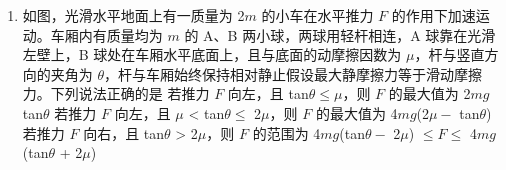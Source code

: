 \documentclass[\gkver]{gaokaozhenti}
\begin{document}
\begin{enumerate}
{B．线圈产生感应电动势的最大值 $E_{\text{max}} = nBS \cdot 4\omega$，又 $S = L^{2}$，联立可得 $E_{\text{max}} = 4nBL^{2}\omega$，则线圈产生感应电动势的有效值 $E=\frac{E_{\max}}{\sqrt{2}}=2\sqrt{2}nBL^{2}\omega$，根据串联电路分压原理可知灯泡两端电压有效值为 $U=\frac{RE}{R+R}=\sqrt{2}nBL^{2}\omega$，B 错误；

C．若用总长为原来两倍的相同漆包线重新绕制成边长仍为 $L$ 的多匝正方形线圈，则线圈的匝数变为原来的 2 倍，线圈产生感应电动势的最大值 $E_{\max}^{'} = 8nBL^{2}\omega$，此时线圈产生感应电动势的有效值 $E' = \frac{E_{\max}'}{\sqrt{2}} = 4\sqrt{2}nBL^{2}\omega$，根据电阻定律 $R' = \rho \frac{l}{S'}$，可知线圈电阻变为原来的 2 倍，即为 $2R$，根据串联电路分压原理可得灯泡两端电压有效值 $U' = \frac{RE'}{R + 2R} = \frac{4 \cdot 2}{3} nBL^{2}\omega$，C 正确；

D．若仅将小轮半径变为原来的两倍，根据 $v = \omega r$ 可知小轮和线圈的角速度变小，根据 $E = \frac{nBS\omega}{\sqrt{2}}$，可知线圈产生的感应电动势有效值变小，则灯泡变暗，D 错误。

故选 AC。
}

\item
如图，光滑水平地面上有一质量为 2$m$ 的小车在水平推力 $F$ 的作用下加速运动。车厢内有质量均为 $m$ 的 A、B 两小球，两球用轻杆相连，A 球靠在光滑左壁上，B 球处在车厢水平底面上，且与底面的动摩擦因数为 $\mu$，杆与竖直方向的夹角为 $\theta$，杆与车厢始终保持相对静止假设最大静摩擦力等于滑动摩擦力。下列说法正确的是
{若推力 $F$ 向左，且 tan$\theta \leq \mu$，则 $F$ 的最大值为 2$mg$tan$\theta$}
{若推力 $F$ 向左，且 $\mu$ < tan$\theta \leq$ 2$\mu$，则 $F$ 的最大值为 4$mg$(2$\mu -$ tan$\theta$)}
{若推力 $F$ 向右，且 tan$\theta$ > 2$\mu$，则 $F$ 的范围为 4$mg$(tan$\theta -$ 2$\mu$) $\leq F \leq$ 4$mg$(tan$\theta$ + 2$\mu$)}
\end{enumerate}
\end{document}
